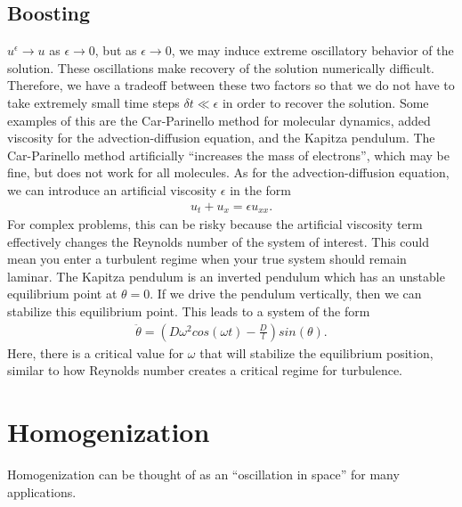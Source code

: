 \subsection{Boosting}
$u^{\epsilon} \to u$ as $\epsilon \to 0$, but as $\epsilon \to 0$, we may induce extreme oscillatory behavior of the solution. These oscillations make recovery of the solution numerically difficult. Therefore, we have a tradeoff between these two factors so that we do not have to take extremely small time steps $\delta t \ll \epsilon$ in order to recover the solution. Some examples of this are the Car-Parinello method for molecular dynamics, added viscosity for the advection-diffusion equation, and the Kapitza pendulum. The Car-Parinello method artificially ``increases the mass of electrons'', which may be fine, but does not work for all molecules. As for the advection-diffusion equation, we can introduce an artificial viscosity  $\epsilon$ in the form
\begin{align} \label{eqn:advec}
    u_{t} + u_{x} = \epsilon u_{xx}.
\end{align}
For complex problems, this can be risky because the artificial viscosity term effectively changes the Reynolds number of the system of interest. This could mean you enter a turbulent regime when your true system should remain laminar.  The Kapitza pendulum is an inverted pendulum which has an unstable equilibrium point at $\theta = 0$. If we drive the pendulum vertically, then we can stabilize this equilibrium point. This leads to a system of the form
\begin{align}
    \ddot{\theta} = \left(D\omega^2cos(\omega t) - \frac{D}{l}\right) sin(\theta).
\end{align}
Here, there is a critical value for $\omega$ that will stabilize the equilibrium position, similar to how Reynolds number creates a critical regime for turbulence.
\section{Homogenization}
Homogenization can be thought of as an ``oscillation in space'' for many applications. 

